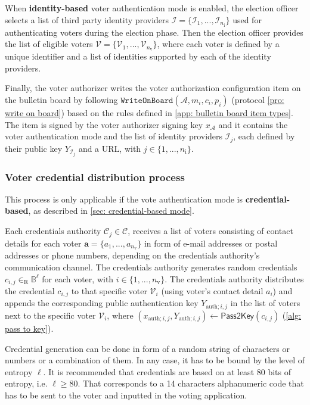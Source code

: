 When \textbf{identity-based} voter authentication mode is enabled, the election officer selects a list of third party identity providers $\boldsymbol{\mathcal{I}} = \{ \mathcal{I}_1, ..., \mathcal{I}_{n_\mathrm{i}} \}$ used for authenticating voters during the election phase. Then the election officer provides the list of eligible voters $\boldsymbol{\mathcal{V}} = \{ \mathcal{V}_1, ..., \mathcal{V}_{n_\mathrm{v}} \}$, where each voter is defined by a unique identifier and a list of identities supported by each of the identity providers.

Finally, the voter authorizer writes the voter authorization configuration item on the bulletin board by following $\mathtt{WriteOnBoard}(\mathcal{A}, m_i, c_i, p_i)$ (protocol \ref{pro: write on board}) based on the rules defined in \cref{app: bulletin board item types}. The item is signed by the voter authorizer signing key $x_\mathcal{A}$ and it contains the voter authentication mode and the list of identity providers $\mathcal{I}_j$, each defined by their public key $Y_{\mathcal{I}_j}$ and a URL, with $j \in \{ 1, ..., n_\mathrm{i} \}$.


\subsubsection{Voter credential distribution process} \label{sec: voter credential distribution process}
This process is only applicable if the vote authentication mode is \textbf{credential-based}, as described in \cref{sec: credential-based mode}.

Each credentials authority $\mathcal{C}_j \in \boldsymbol{\mathcal{C}}$, receives a list of voters consisting of contact details for each voter $\boldsymbol{a} = \{ a_1, ..., a_{n_\mathrm{v}} \}$ in form of e-mail addresses or postal addresses or phone numbers, depending on the credentials authority's communication channel. The credentials authority generates random credentials $c_{i, j} \in_\mathrm{R} \mathbb{B}^\ell$ for each voter, with $i \in \{ 1, ..., n_\mathrm{v} \}$. The credentials authority distributes the credential $c_{i, j}$ to that specific voter $\mathcal{V}_i$ (using voter's contact detail $a_i$) and appends the corresponding public authentication key $Y_{\mathrm{auth}; i, j}$ in the list of voters next to the specific voter $\mathcal{V}_i$, where $(x_{\mathrm{auth}; i, j}, Y_{\mathrm{auth}; i, j}) \gets \mathsf{Pass2Key}(c_{i, j})$ (\cref{alg: pass to key}).

Credential generation can be done in form of a random string of characters or numbers or a combination of them. In any case, it has to be bound by the level of entropy $\ell$. It is recommended that credentials are based on at least 80 bits of entropy, i.e. $\ell \geq 80$. That corresponds to a 14 characters alphanumeric code that has to be sent to the voter and inputted in the voting application.

